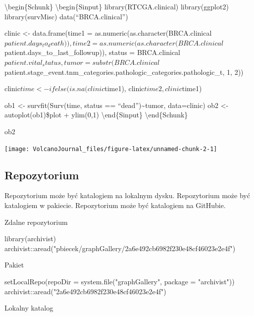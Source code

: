 \textbackslash{}begin\{Schunk\} \textbackslash{}begin\{Sinput\}
library(RTCGA.clinical) library(ggplot2) library(survMisc)
data(``BRCA.clinical'')

clinic \textless{}- data.frame(time1 =
as.numeric(as.character(BRCA.clinical\(patient.days_to_death)),  time2 = as.numeric(as.character(BRCA.clinical\)patient.days\_to\_last\_followup)),
status =
BRCA.clinical\(patient.vital_status,  tumor = substr(BRCA.clinical\)patient.stage\_event.tnm\_categories.pathologic\_categories.pathologic\_t,
1, 2))

clinic\(time <- ifelse(is.na(clinic\)time1),
clinic\(time2, clinic\)time1)

ob1 \textless{}- survfit(Surv(time, status ==
``dead'')\textasciitilde{}tumor, data=clinic) ob2 \textless{}-
autoplot(ob1)\$plot + ylim(0,1) \textbackslash{}end\{Sinput\}
\textbackslash{}end\{Schunk\}

\begin{Schunk}
\begin{Sinput}
ob2
\end{Sinput}

\texttt{[image: VolcanoJournal\_files/figure-latex/unnamed-chunk-2-1]} \end{Schunk}

\subsection{Repozytorium}\label{repozytorium}

Repozytorium może być katalogiem na lokalnym dysku. Repozytorium może
być katalogiem w pakiecie. Repozytorium może być katalogiem na GitHubie.

Zdalne repozytorium

\begin{Schunk}
\begin{Sinput}
library(archivist)
archivist::aread("pbiecek/graphGallery/2a6e492cb6982f230e48cf46023e2e4f")
\end{Sinput}
\end{Schunk}

Pakiet

\begin{Schunk}
\begin{Sinput}
setLocalRepo(repoDir = system.file("graphGallery", package = "archivist"))
archivist::aread("2a6e492cb6982f230e48cf46023e2e4f")
\end{Sinput}
\end{Schunk}

Lokalny katalog


